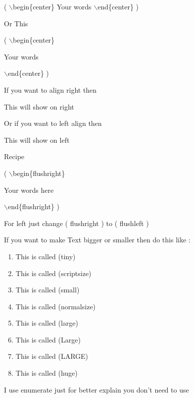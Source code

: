 \documentclass[11pt]{article}
\begin{document}
 ( $\backslash$begin\{center\} Your words  $\backslash$end\{center\} )
 
 Or This
 
 ( $\backslash$begin\{center\}
 
  Your words 
  
   $\backslash$end\{center\} )

\vspace{1cm}

If you want to align right then

\begin{flushright}
This will show on right
\end{flushright}

\vspace{1cm}

Or if you want to left align then

\begin{flushleft}
This will show on left
\end{flushleft}

Recipe 

( $\backslash$begin\{flushright\}

  Your words here

  $\backslash$end\{flushright\} )
  
  For left just change ( flushright ) to ( flushleft )
  
\vspace{1cm}

If you want to make Text bigger or smaller then do this like :

\begin{enumerate}

\item \tiny{This is called (tiny)}
\item \scriptsize{This is called (scriptsize)}
\item \small{This is called (small)}
\item \normalsize{This is called (normalsize)}
\item \large{This is called (large)}
\item \Large{This is called (Large)}
\item \LARGE{This is called (LARGE)}
\item \huge{This is called (huge)}

\end{enumerate}  
  
  
  \vspace{1cm}  
  
  I use enumerate just for better explain you don't need to use
  
\end{document}
